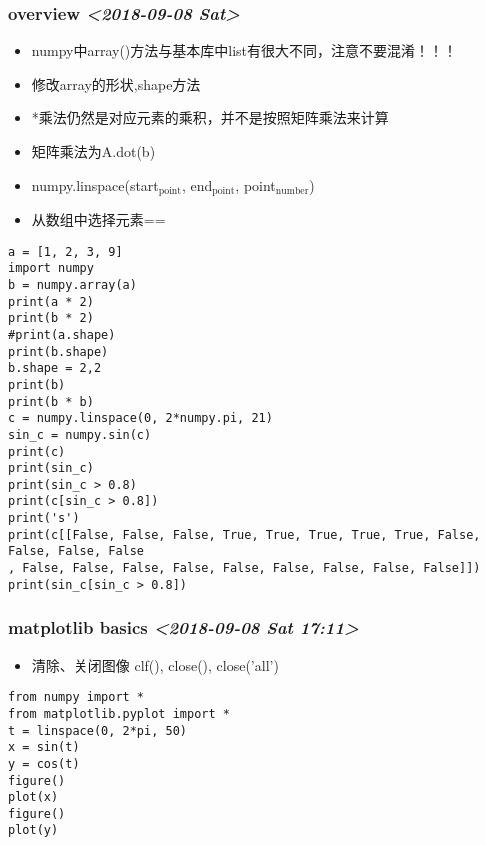 \documentclass[11pt]{article}
\begin{document}
\subsubsection{overview \textit{<2018-09-08 Sat>}}
\label{sec:org091d3a4}
\begin{itemize}
\item numpy中array()方法与基本库中list有很大不同，注意不要混淆！！！
\item 修改array的形状,shape方法
\item *乘法仍然是对应元素的乘积，并不是按照矩阵乘法来计算
\item 矩阵乘法为A.dot(b)
\item numpy.linspace(start\(_{\text{point}}\), end\(_{\text{point}}\), point\(_{\text{number}}\))
\item 从数组中选择元素==
\end{itemize}
\begin{verbatim}
a = [1, 2, 3, 9]
import numpy
b = numpy.array(a)
print(a * 2)
print(b * 2)
#print(a.shape)
print(b.shape)
b.shape = 2,2
print(b)
print(b * b)
c = numpy.linspace(0, 2*numpy.pi, 21)
sin_c = numpy.sin(c)
print(c)
print(sin_c)
print(sin_c > 0.8)
print(c[sin_c > 0.8])
print('s')
print(c[[False, False, False, True, True, True, True, True, False, False, False, False
, False, False, False, False, False, False, False, False, False]])
print(sin_c[sin_c > 0.8])
\end{verbatim}
\subsubsection{matplotlib basics \textit{<2018-09-08 Sat 17:11>}}
\label{sec:org9575366}
\begin{itemize}
\item 清除、关闭图像 clf(), close(), close('all')
\end{itemize}
\begin{verbatim}
from numpy import *
from matplotlib.pyplot import *
t = linspace(0, 2*pi, 50)
x = sin(t)
y = cos(t)
figure()
plot(x)
figure()
plot(y)
\end{verbatim}
\end{document}
